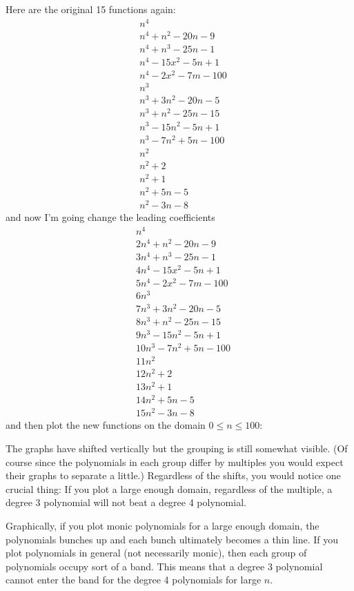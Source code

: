 Here are the original 15 functions again:
\begin{align*}
&n^4 \\
&n^4 + n^2 - 20n - 9 \\
&n^4 +  n^3 - 25n - 1 \\
&n^4 - 15x^2 - 5n + 1 \\
&n^4 - 2x^2 - 7m - 100 \\
&n^3 \\
&n^3 + 3n^2 - 20n - 5 \\
&n^3 +   n^2 - 25n - 15 \\
&n^3 - 15n^2 - 5n + 1 \\
&n^3 - 7n^2 + 5n - 100 \\
&n^2 \\
&n^2 + 2 \\
&n^2 + 1 \\
&n^2 + 5n - 5 \\
&n^2 - 3n - 8
\end{align*}
and now I'm going change the leading coefficients
\begin{align*}
&n^4 \\
&2n^4 + n^2 - 20n - 9 \\
&3n^4 +  n^3 - 25n - 1 \\
&4n^4 - 15x^2 - 5n + 1 \\
&5n^4 - 2x^2 - 7m - 100 \\
&6n^3 \\
&7n^3 + 3n^2 - 20n - 5 \\
&8n^3 +   n^2 - 25n - 15 \\
&9n^3 - 15n^2 - 5n + 1 \\
&10n^3 - 7n^2 + 5n - 100 \\
&11n^2 \\
&12n^2 + 2 \\
&13n^2 + 1 \\
&14n^2 + 5n - 5 \\
&15n^2 - 3n - 8
\end{align*}
and then plot the new functions on the domain $0 \leq n \leq 100$:


The graphs have shifted vertically but the grouping is still somewhat visible.
(Of course since the polynomials in each group differ by 
multiples you would expect their graphs to separate a little.)
Regardless of the shifts, you would notice one crucial thing:
If you plot a large enough domain, regardless of the multiple,
a degree 3 polynomial will not beat a degree 4 polynomial.

Graphically, if you plot monic polynomials for a large enough domain,
the polynomials bunches up and each bunch ultimately becomes a thin line.
If you plot polynomials in general (not necessarily monic), then
each group of polynomials occupy sort of a band.
This means that a degree 3 polynomial cannot enter the band for the degree 4 
polynomials for large $n$.


